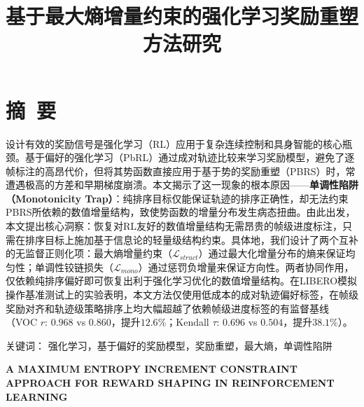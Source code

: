 

\renewcommand{\mytitle}{基于最大熵增量约束的强化学习奖励重塑方法研究}
\renewcommand{\mytitleEN}{A MAXIMUM ENTROPY INCREMENT CONSTRAINT APPROACH FOR REWARD SHAPING IN REINFORCEMENT LEARNING}


\setlength{\baselineskip}{20pt}

\title{\hei{}\bfseries\mytitle}
\maketitle
\thispagestyle{empty}
\clearpage



{\pagestyle{plain}
\tableofcontents
\clearpage}


\section*{摘~要}
设计有效的奖励信号是强化学习（RL）应用于复杂连续控制和具身智能的核心瓶颈。基于偏好的强化学习（PbRL）通过成对轨迹比较来学习奖励模型，避免了逐帧标注的高昂代价，但将其势函数直接应用于基于势的奖励重塑（PBRS）时，常遭遇极高的方差和早期梯度崩溃。本文揭示了这一现象的根本原因——\textbf{单调性陷阱（Monotonicity Trap）}：纯排序目标仅能保证轨迹的排序正确性，却无法约束PBRS所依赖的数值增量结构，致使势函数的增量分布发生病态扭曲。由此出发，本文提出核心洞察：恢复对RL友好的数值增量结构无需昂贵的帧级进度标注，只需在排序目标上施加基于信息论的轻量级结构约束。具体地，我们设计了两个互补的无监督正则化项：最大熵增量约束（$\mathcal{L}_{struct}$）通过最大化增量分布的熵来保证均匀性；单调性铰链损失（$\mathcal{L}_{mono}$）通过惩罚负增量来保证方向性。两者协同作用，仅依赖纯排序偏好即可恢复出利于强化学习优化的数值增量结构。在LIBERO模拟操作基准测试上的实验表明，本文方法仅使用低成本的成对轨迹偏好标签，在帧级奖励对齐和轨迹级策略排序上均大幅超越了依赖帧级进度标签的有监督基线（VOC $r$: $0.968$ vs $0.860$，提升$12.6\%$；Kendall $\tau$: $0.696$ vs $0.504$，提升$38.1\%$）。

\vspace{1em}\noindent
{\hei 关键词：}
{\song 强化学习，基于偏好的奖励模型，奖励重塑，最大熵，单调性陷阱}
\clearpage



{\centering{}\bfseries\sffamily \mytitleEN\par}
\vspace{1em}
